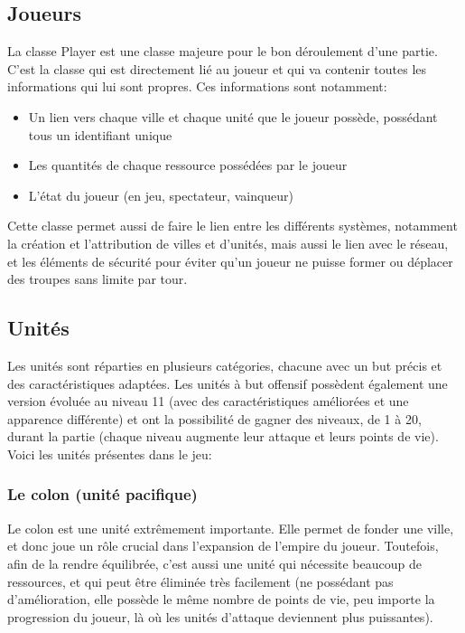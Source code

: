\documentclass[12pt]{report}
\begin{document}
\subsection{Joueurs}

La classe Player est une classe majeure pour le bon déroulement d’une partie.
C’est la classe qui est directement lié au joueur et qui va contenir toutes les
informations qui lui sont propres. Ces informations sont notamment:

\begin{itemize}
    \item Un lien vers chaque ville et chaque unité que le joueur possède,
        possédant tous un identifiant unique
    \item Les quantités de chaque ressource possédées par le joueur
    \item L’état du joueur (en jeu, spectateur, vainqueur)
\end{itemize}

Cette classe permet aussi de faire le lien entre les différents systèmes,
notamment la création et l’attribution de villes et d’unités, mais aussi le lien
avec le réseau, et les éléments de sécurité pour éviter qu’un joueur ne puisse
former ou déplacer des troupes sans limite par tour.

\subsection{Unités}

Les unités sont réparties en plusieurs catégories, chacune avec un but précis et
des caractéristiques adaptées. Les unités à but offensif possèdent également une
version évoluée au niveau 11 (avec des caractéristiques améliorées et une
apparence différente) et ont la possibilité de gagner des niveaux, de 1 à 20,
durant la partie (chaque niveau augmente leur attaque et leurs points de vie).
Voici les unités présentes dans le jeu:

\subsubsection{Le colon (unité pacifique)}

Le colon est une unité extrêmement importante. Elle permet de fonder une ville,
et donc joue un rôle crucial dans l’expansion de l’empire du joueur. Toutefois,
afin de la rendre équilibrée, c’est aussi une unité qui nécessite beaucoup de
ressources, et qui peut être éliminée très facilement (ne possédant pas
d’amélioration, elle possède le même nombre de points de vie, peu importe la
progression du joueur, là où les unités d’attaque deviennent plus puissantes).
\end{document}
